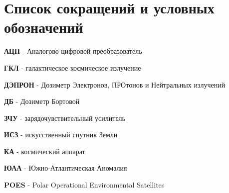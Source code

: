 \chapter*{Список сокращений и условных обозначений}             %

\textbf{АЦП} - Аналогово-цифровой преобразователь

\textbf{ГКЛ} - галактическое космическое излучение

\textbf{ДЭПРОН} - Дозиметр Электронов, ПРОтонов и Нейтральных излучений

\textbf{ДБ} - Дозиметр Бортовой

\textbf{ЗЧУ} - зарядочувствительный усилитель

\textbf{ИСЗ} - искусственный спутник Земли

\textbf{КА} - космический аппарат

\textbf{ЮАА} - Южно-Атлантическая Аномалия

\textbf{POES} - Polar Operational Environmental Satellites